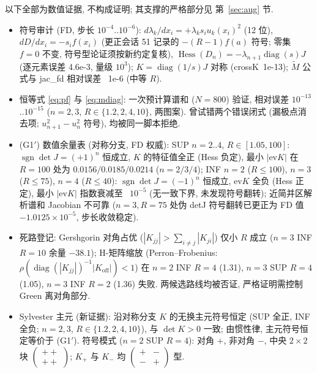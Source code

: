 \documentclass[UTF8]{ctexart}
\begin{document}
以下全部为数值证据, 不构成证明; 其支撑的严格部分见
第~\ref{sec:aug} 节.

\begin{itemize}
	\item 符号审计 (FD, 步长 $10^{-4}$..$10^{-6}$):
	$d\lambda_k/dx_i=+\lambda_ks_iu_k(x_i)^2$ (12 位),
	$dD/dx_i=-s_if(x_i)$ (更正会话 51 记录的 $-(R-1)f(a)$ 符号;
	零集 $f=0$ 不变, 符号型论证须按新约定复核),
	$\operatorname{Hess}(D_n)=-\lambda_{n+1}\operatorname{diag}(s)J$
	(逐元素误差 4.6e-3, 量级 $10^3$);
	$K=\operatorname{diag}(1/s)J$ 对称 (crossK~1e-13);
	$\tilde M$ 公式与 jac\_fd 相对误差 ~1e-6 (中等 $R$).
	\item 恒等式 \eqref{eq:pf} 与 \eqref{eq:mdiag}: 一次预计算谱和
	($N=800$) 验证, 相对误差 $10^{-13}$..$10^{-15}$
	($n=2,3$, $R\in\{1.2,2,4,10\}$, 两图案). 曾试错两个错误闭式
	(漏极点消去项; $u_{n+1}^2-u_n^2$ 符号), 均被同一脚本拒绝.
	\item (G1$'$) 数值余量表 (对称分支, FD 权威):
	SUP $n=2..4$, $R\in[1.05,100]$: $\operatorname{sgn}\det J=(+1)^n$ 恒成立,
	$K$ 的特征值全正 (Hess 负定), 最小 $|\mathrm{ev}K|$ 在 $R=100$ 处为
	$0.0156/0.0185/0.0214$ ($n=2/3/4$);
	INF $n=2$ ($R\le100$), $n=3$ ($R\le75$), $n=4$ ($R\le40$):
	$\operatorname{sgn}\det J=(-1)^n$ 恒成立, ev$K$ 全负 (Hess 正定),
	最小 $|\mathrm{ev}K|$ 指数衰减至 ~$10^{-5}$ (无一致下界, 未发现符号翻转);
	近简并区解析谱和 Jacobian 不可靠 ($n=3,R=75$ 处伪 detJ 符号翻转已更正为
	FD 值 $-1.0125\times10^{-5}$, 步长收敛稳定).
	\item 死路登记: Gershgorin 对角占优 ($|K_{jj}|>\sum_{i\ne j}|K_{ji}|$)
	仅小 $R$ 成立 ($n=3$ INF $R=10$ 余量 $-38.1$); H-矩阵缩放
	(Perron--Frobenius: $\rho(\operatorname{diag}(|K_{jj}|)^{-1}|K_{\mathrm{off}}|)<1$)
	在 $n=2$ INF $R=4$ (1.31), $n=3$ SUP $R=4$ (1.05), $n=3$ INF $R=2$ (1.36)
	失败. 两候选路线均被否证, 严格证明需控制 Green 离对角部分.
	\item Sylvester 主元 (新证据): 沿对称分支 $K$ 的无换主元符号恒定
	(SUP 全正, INF 全负; $n=2,3$, $R\in\{1.2,2,4,10\}$), 与 $\det K>0$ 一致;
	由惯性律, 主元符号恒定等价于 (G1$'$). 符号模式
	($n=2$ SUP $R=4$): 对角 $+$, 非对角 $-$, 中央 $2\times2$ 块
	$\left(\begin{smallmatrix}++\\++\end{smallmatrix}\right)$;
	$K_+$ 与 $K_-$ 均 $\left(\begin{smallmatrix}+&-\\-&+\end{smallmatrix}\right)$ 型.
\end{itemize}
\end{document}

